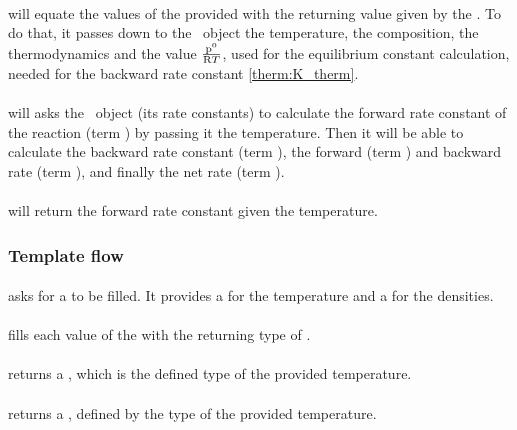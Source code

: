 \paragraph{\ReactionSet}
will equate the values of the provided  with
the returning value given by the \Reaction. To do that, it passes down to
the \Reaction\ object the temperature, the composition, the thermodynamics and
the value $\frac{\pz}{\Rg \Temp}$, used for the equilibrium constant calculation,
needed for the backward rate constant \eqref{therm:K_therm}.

\paragraph{\Reaction} will asks the \KineticsType\ object (its rate constants) to calculate
the forward rate constant of the reaction (term \fwdratecons[r]) by passing
it the temperature. Then it will be able 
to calculate the backward rate constant (term \bkwdratecons[r]), 
the forward (term \fwdrate[r]) and backward rate (term \bkwdrate[r]), 
and finally the net rate (term \rate[r]).

\paragraph{\KineticsType} will return the forward rate constant \fwdratecons[r] given
the temperature.

\subsubsection{Template flow}

\paragraph{\KineticsEvaluator} asks for a  to be filled. It
provides a  for the temperature and a  for
the densities.

\paragraph{\ReactionSet} fills each value of the  with
the returning type of \Reaction.

\paragraph{\Reaction} returns a , which is the defined type of the
provided temperature.

\paragraph{\KineticsType} returns a , defined by the type of the
provided temperature.

